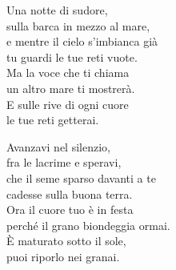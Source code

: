 
\strofa Una notte di sudore,\\
sulla barca in mezzo al mare,\\
e mentre il cielo s'imbianca già\\
tu guardi le tue reti vuote.\\
Ma la voce che ti chiama\\
un altro mare ti mostrerà.\\
E sulle rive di ogni cuore\\
le tue reti getterai.

\spazio


\spazio

\strofa Avanzavi nel silenzio,\\
fra le lacrime e speravi,\\
che il seme sparso davanti a te\\
cadesse sulla buona terra.\\
Ora il cuore tuo è in festa\\
perché il grano biondeggia ormai.\\
È maturato sotto il sole,\\
puoi riporlo nei granai.

\spazio

